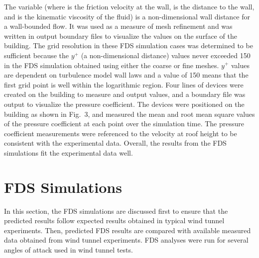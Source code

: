 The variable (where is the friction velocity at the wall, is the distance to the wall, and is the kinematic viscosity of the fluid) is a non-dimensional wall distance for a wall-bounded flow. It was used as a measure of mesh refinement and was written in output boundary files to visualize the values on the surface of the building. The grid resolution in these FDS simulation cases was determined to be sufficient because the $y^+$ (a non-dimensional distance) values never exceeded 150 in the FDS simulation obtained using either the coarse or fine meshes. $y^+$ values are dependent on turbulence model wall laws and a value of 150 means that the first grid point is well within the logarithmic region. Four lines of devices were created on the building to measure and output values, and a boundary file was output to visualize the pressure coefficient. The devices were positioned on the building as shown in Fig.~3, and measured the mean and root mean square values of the pressure coefficient at each point over the simulation time. The pressure coefficient measurements were referenced to the velocity at roof height to be consistent with the experimental data. Overall, the results from the FDS simulations fit the experimental data well.


\section{FDS Simulations}

In this section, the FDS simulations are discussed first to ensure that the predicted results follow expected results obtained in typical wind tunnel experiments. Then, predicted FDS results are compared with available measured data obtained from wind tunnel experiments. FDS analyses were run for several angles of attack used in wind tunnel tests.

